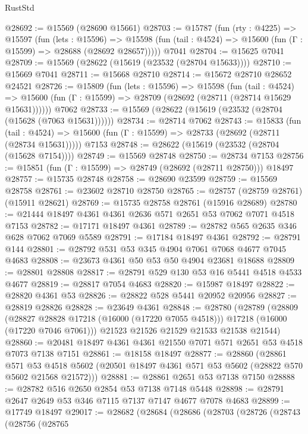 \begin{lexlean}{RustStd}
\begin{coremodule}
@28692 := @15569 (@28690 @15661)
@28703 := @15787
    (fun (rty : @4225) =>
    @15597
      (fun (lets : @15596) =>
      @15598 (fun (tail : @4524) => @15600 (fun (Γ : @15599) => @28688 (@28692 @28657)))))
    @7041
@28704 := @15625 @7041
@28709 := @15569 (@28622 (@15619 (@23532 (@28704 @15633))))
@28710 := @15669 @7041
@28711 := @15668 @28710
@28714 := @15672 @28710 @28652 @24521
@28726 := @15809
    (fun (lets : @15596) =>
    @15598
      (fun (tail : @4524) =>
      @15600 (fun (Γ : @15599) => @28709 (@28692 (@28711 (@28714 @15629 @15631))))))
    @7062
@28733 := @15569 (@28622 (@15619 (@23532 (@28704 (@15628 (@7063 @15631))))))
@28734 := @28714 @7062
@28743 := @15833
    (fun (tail : @4524) => @15600 (fun (Γ : @15599) => @28733 (@28692 (@28711 (@28734 @15631)))))
    @7153
@28748 := @28622 (@15619 (@23532 (@28704 (@15628 @7154))))
@28749 := @15569 @28748
@28750 := @28734 @7153
@28756 := @15851 (fun (Γ : @15599) => @28749 (@28692 (@28711 @28750))) @18497
@28757 := @15735 @28748
@28758 := @28690 @23599
@28759 := @15569 @28758
@28761 := @23602 @28710 @28750
@28765 := @28757 (@28759 @28761) (@15911 @28621)
@28769 := @15735 @28758 @28761 (@15916 @28689)
@28780 := @21444 @18497 @4361 @4361 @2636 @571 @2651 @53 @7062 @7071 @4518 @7153
@28782 := @17171 @18497 @4361
@28789 := @28782 @565 @2635 @346 @628 @7062 @7069 @5589
@28791 := @17184 @18497 @4361
@28792 := @28791 @144
@28801 := @28792 @531 @53 @345 @4904 @7061 @7068 @4677 @7045 @4683
@28808 := @23673 @4361 @50 @53 @50 @4904 @23681 @18688
@28809 := @28801 @28808
@28817 := @28791 @529 @130 @53 @16 @5441 @4518 @4533 @4677
@28819 := @28817 @7054 @4683
@28820 := @15987 @18497
@28822 := @28820 @4361 @53
@28826 := @28822 @528 @5441 @20952 @20956
@28827 := @28819 @28826
@28828 := @23649 @4361
@28848 := @28780
    (@28789
      (@28809
        (@28827 @28828 @17218 (@16000 (@17220 @7055 @4518)))
        @17218
        (@16000 (@17220 @7046 @7061)))
      @21523
      @21526
      @21529
      @21533
      @21538
      @21544)
@28860 := @20481 @18497 @4361 @4361 @21550 @7071 @571 @2651 @53 @4518 @7073 @7138 @7151
@28861 := @18158 @18497
@28877 := @28860
    (@28861
      @571
      @53
      @4518
      @5602
      (@20501 @18497 @4361 @571 @53 @5602 (@28822 @570 @5602 @21568 @21572)))
@28881 := @28861 @2651 @53 @7138 @7150
@28888 := @28782 @516 @2650 @2854 @53 @7138 @7148 @5448
@28898 := @28791 @2647 @2649 @53 @346 @7115 @7137 @7147 @4677 @7078 @4683
@28899 := @17749 @18497
@29017 := @28682
    (@28684
      (@28686
        (@28703
          (@28726
            (@28743
              (@28756
                (@28765

\end{coremodule}
\end{lexlean}
